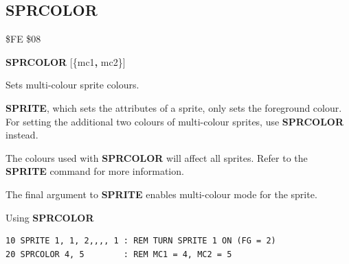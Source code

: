 \newpage
\subsection{SPRCOLOR}
\begin{description}[leftmargin=2cm,style=nextline]
\item [Token:]    \$FE \$08

\item [Format:]   {\bf SPRCOLOR} [\{mc1{\bf,} mc2\}]

\item [Usage:]    Sets multi-colour sprite colours.

                  {\bf SPRITE}, which sets the attributes of a sprite, only sets the foreground colour. For setting the additional two colours of multi-colour sprites, use {\bf SPRCOLOR} instead.

\item [Remarks:]  The colours used with {\bf SPRCOLOR} will affect all sprites. Refer to the {\bf SPRITE} command for more information.

                  The final argument to {\bf SPRITE} enables multi-colour mode for the sprite.

\item [Example:]  Using {\bf SPRCOLOR}

\begin{tcolorbox}[colback=black,coltext=white]
\verbatimfont{\codefont}
\begin{verbatim}
10 SPRITE 1, 1, 2,,,, 1 : REM TURN SPRITE 1 ON (FG = 2)
20 SPRCOLOR 4, 5        : REM MC1 = 4, MC2 = 5
\end{verbatim}
\end{tcolorbox}
\end{description}


\newpage
